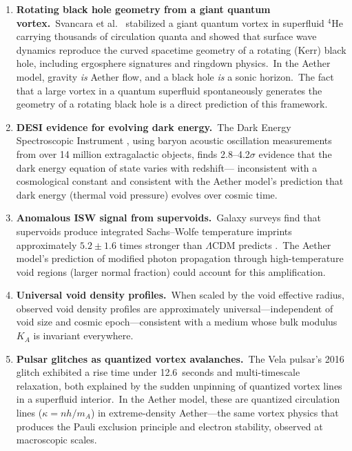 ﻿\documentclass[12pt,letterpaper]{article}
\newcommand{\Ka}{K_{\!A}}
\begin{document}
\begin{enumerate}[leftmargin=2em]
  \item \textbf{Rotating black hole geometry from a giant quantum vortex.}\
    Svancara et al.\ \cite{svancara2024} stabilized a giant quantum vortex in
    superfluid ${}^4$He carrying thousands of circulation quanta and showed that
    surface wave dynamics reproduce the curved spacetime geometry of a rotating
    (Kerr) black hole, including ergosphere signatures and ringdown physics.\
    In the Aether model, gravity \emph{is} Aether flow, and a black hole
    \emph{is} a sonic horizon.\ The fact that a large vortex in a quantum
    superfluid spontaneously generates the geometry of a rotating black hole
    is a direct prediction of this framework.

  \item \textbf{DESI evidence for evolving dark energy.}\ The Dark Energy
    Spectroscopic Instrument \cite{desi2025}, using baryon acoustic oscillation
    measurements from over 14 million extragalactic objects, finds 2.8--4.2$\sigma$
    evidence that the dark energy equation of state varies with redshift---
    inconsistent with a cosmological constant and consistent with the Aether
    model's prediction that dark energy (thermal void pressure) evolves over
    cosmic time.

  \item \textbf{Anomalous ISW signal from supervoids.}\ Galaxy surveys find
    that supervoids produce integrated Sachs--Wolfe temperature imprints
    approximately $5.2 \pm 1.6$ times stronger than $\Lambda$CDM predicts
    \cite{kovacs2022}.\ The Aether model's prediction of modified photon
    propagation through high-temperature void regions (larger normal fraction) could
    account for this amplification.

  \item \textbf{Universal void density profiles.}\ When scaled by the void
    effective radius, observed void density profiles are approximately
    universal---independent of void size and cosmic epoch---consistent with
    a medium whose bulk modulus $\Ka$ is invariant everywhere.


  \item \textbf{Pulsar glitches as quantized vortex avalanches.}\ The Vela
    pulsar's 2016 glitch \cite{palfreyman2018,ashton2019} exhibited a rise
    time under 12.6~seconds and multi-timescale relaxation, both explained
    by the sudden unpinning of quantized vortex lines in a superfluid
    interior.\ In the Aether model, these are quantized circulation lines
    ($\kappa = nh/m_A$) in extreme-density Aether---the same vortex physics
    that produces the Pauli exclusion principle and electron stability,
    observed at macroscopic scales.


\end{enumerate}
\end{document}
